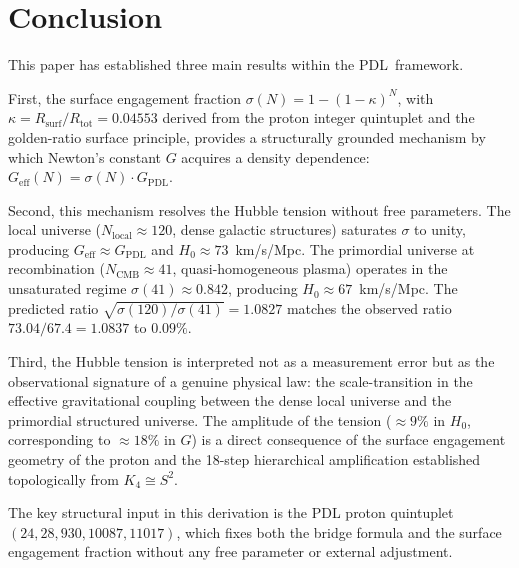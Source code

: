 \documentclass[11pt,a4paper]{article}
\theoremstyle{definition}
\newcommand{\PDL}{\textnormal{PDL}}
\newcommand{\Rsurf}{R_{\mathrm{surf}}}
\newcommand{\Rtot}{R_{\mathrm{tot}}}
\newcommand{\Geff}{G_{\mathrm{eff}}}
\newcommand{\GPDL}{G_{\mathrm{PDL}}}
\newcommand{\Hzero}{H_0}
\newcommand{\kap}{\kappa}
\newcommand{\sig}{\sigma}
\begin{document}
\section*{Conclusion}

This paper has established three main results within the \PDL\ framework.

First, the surface engagement fraction $\sig(N) = 1-(1-\kap)^N$, with $\kap = \Rsurf/\Rtot = 0.04553$ derived from the proton integer quintuplet and the golden-ratio surface principle, provides a structurally grounded mechanism by which Newton's constant $G$ acquires a density dependence: $\Geff(N) = \sig(N)\cdot\GPDL$.

Second, this mechanism resolves the Hubble tension without free parameters. The local universe ($N_{\mathrm{local}} \approx 120$, dense galactic structures) saturates $\sig$ to unity, producing $\Geff \approx \GPDL$ and $\Hzero \approx 73$~km/s/Mpc. The primordial universe at recombination ($N_{\mathrm{CMB}} \approx 41$, quasi-homogeneous plasma) operates in the unsaturated regime $\sig(41) \approx 0.842$, producing $\Hzero \approx 67$~km/s/Mpc. The predicted ratio $\sqrt{\sig(120)/\sig(41)} = 1.0827$ matches the observed ratio $73.04/67.4 = 1.0837$ to $0.09\%$.

Third, the Hubble tension is interpreted not as a measurement error but as the observational signature of a genuine physical law: the scale-transition in the effective gravitational coupling between the dense local universe and the primordial structured universe. The amplitude of the tension ($\approx 9\%$ in $\Hzero$, corresponding to $\approx 18\%$ in $G$) is a direct consequence of the surface engagement geometry of the proton and the 18-step hierarchical amplification established topologically from $K_4 \cong S^2$.

The key structural input in this derivation is the PDL proton quintuplet $(24, 28, 930, 10087, 11017)$, which fixes both the bridge formula and the surface engagement fraction without any free parameter or external adjustment.


\nocite{*}

\end{document}
